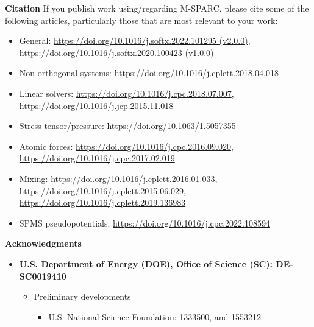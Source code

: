 \documentclass[xcolor=dvipsnames,t]{beamer}
\begin{document}
\begin{frame}[allowframebreaks]{\textbf{Citation}} \label{Citation}
If you publish work using/regarding M-SPARC, please cite some of the following articles, particularly those that are most relevant to your work:
\begin{itemize}
    \item General: \url{https://doi.org/10.1016/j.softx.2022.101295 (v2.0.0)}, \url{https://doi.org/10.1016/j.softx.2020.100423 (v1.0.0)}
    \item Non-orthogonal systems: \url{https://doi.org/10.1016/j.cplett.2018.04.018}
    \item Linear solvers: \url{https://doi.org/10.1016/j.cpc.2018.07.007},    \url{https://doi.org/10.1016/j.jcp.2015.11.018}
    \item Stress tensor/pressure: \url{https://doi.org/10.1063/1.5057355}
    \item Atomic forces: \url{https://doi.org/10.1016/j.cpc.2016.09.020}, \url{https://doi.org/10.1016/j.cpc.2017.02.019}
    \item Mixing: \url{https://doi.org/10.1016/j.cplett.2016.01.033}, \url{https://doi.org/10.1016/j.cplett.2015.06.029}, \url{https://doi.org/10.1016/j.cplett.2019.136983}
    \item SPMS pseudopotentials: \url{https://doi.org/10.1016/j.cpc.2022.108594}
\end{itemize}
\end{frame}



  \begin{frame}[allowframebreaks]{\textbf{Acknowledgments}} \label{Acknowledgments}
  
  \begin{itemize}
      \item \textbf{U.S. Department of Energy (DOE), Office of Science (SC): DE-SC0019410} \\

      \vspace{10pt}
      \begin{itemize}
          \item Preliminary developments
          \begin{itemize}
              \item U.S. National Science Foundation: 1333500, and 1553212
          \end{itemize}
      \end{itemize}
      
      
  \end{itemize}
  
  \end{frame}
\end{document}
